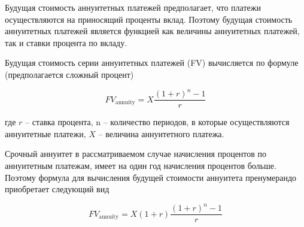 Будущая стоимость аннуитетных платежей предполагает, что платежи осуществляются на приносящий проценты вклад. Поэтому будущая стоимость аннуитетных платежей является функцией как величины аннуитетных платежей, так и ставки процента по вкладу.

Будущая стоимость серии аннуитетных платежей (FV) вычисляется по формуле (предполагается сложный процент)

$$
FV_\mathrm{annuity} = X \dfrac{(1+r)^n-1}{r} 
$$

где $ r $ -- ставка процента, n -- количество периодов, в которые осуществляются аннуитетные платежи, $ X $ -- величина аннуитетного платежа.

Срочный аннуитет в рассматриваемом случае начисления процентов по аннуитетным платежам, имеет на один год начисления процентов больше. Поэтому формула для вычисления будущей стоимости аннуитета пренумерандо приобретает следующий вид

$$
FV_\mathrm{annuity} = X (1+r) \dfrac{(1+r)^n-1}{r}
$$